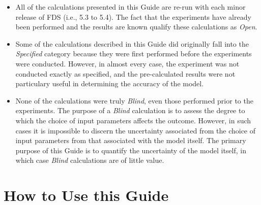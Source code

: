 \begin{itemize}
\item All of the calculations presented in this Guide are re-run with each minor release of FDS (i.e., 5.3 to 5.4). The fact that the experiments have already been performed and the results are known qualify these calculations as {\em Open}.
\item Some of the calculations described in this Guide did originally fall into the {\em Specified} category because they were first performed before the experiments were conducted. However, in almost every case, the experiment was not conducted exactly as specified, and the pre-calculated results were not particulary useful in determining the accuracy of the model.
\item None of the calculations were truly {\em Blind}, even those performed prior to the experiments. The purpose of a {\em Blind} calculation is to assess the degree to which the choice of input parameters affects the outcome. However, in such cases it is impossible to discern the uncertainty associated from the choice of input parameters from that associated with the model itself. The primary purpose of this Guide is to quantify the uncertainty of the model itself, in which case {\em Blind} calculations are of little value.
\end{itemize}


\section{How to Use this Guide}

